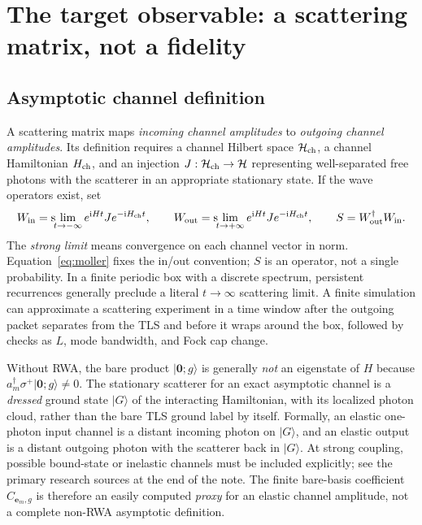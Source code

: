 \documentclass[11pt,a4paper]{article}
\newcommand{\ket}[1]{\lvert #1\rangle}
\newcommand{\ii}{\mathrm i}
\newcommand{\HH}{\mathcal H}
\begin{document}
\section{The target observable: a scattering matrix, not a fidelity}
\label{sec:smatrix}
\subsection{Asymptotic channel definition}
A scattering matrix maps \emph{incoming channel amplitudes} to \emph{outgoing channel amplitudes}. Its definition requires a channel Hilbert space $\HH_{\rm ch}$, a channel Hamiltonian $H_{\rm ch}$, and an injection $J:\HH_{\rm ch}\to\HH$ representing well-separated free photons with the scatterer in an appropriate stationary state. If the wave operators exist, set
\begin{equation}
 W_{\rm in}=\mathrm{s}\!\!\lim_{t\to-\infty}e^{\ii Ht}J e^{-\ii H_{\rm ch}t},\qquad
 W_{\rm out}=\mathrm{s}\!\!\lim_{t\to+\infty}e^{\ii Ht}J e^{-\ii H_{\rm ch}t},
 \qquad S=W_{\rm out}^{\dagger}W_{\rm in}.
 \label{eq:moller}
\end{equation}
The \emph{strong limit} means convergence on each channel vector in norm. Equation~\eqref{eq:moller} fixes the in/out convention; $S$ is an operator, not a single probability. In a finite periodic box with a discrete spectrum, persistent recurrences generally preclude a literal $t\to\infty$ scattering limit. A finite simulation can approximate a scattering experiment in a time window after the outgoing packet separates from the TLS and before it wraps around the box, followed by checks as $L$, mode bandwidth, and Fock cap change.

Without RWA, the bare product $\ket{\mathbf0;g}$ is generally \emph{not} an eigenstate of $H$ because $a_m^\dagger\sigma^+\ket{\mathbf0;g}\ne0$. The stationary scatterer for an exact asymptotic channel is a \emph{dressed} ground state $\ket G$ of the interacting Hamiltonian, with its localized photon cloud, rather than the bare TLS ground label by itself. Formally, an elastic one-photon input channel is a distant incoming photon on $\ket G$, and an elastic output is a distant outgoing photon with the scatterer back in $\ket G$. At strong coupling, possible bound-state or inelastic channels must be included explicitly; see the primary research sources at the end of the note. The finite bare-basis coefficient $C_{\mathbf e_m,g}$ is therefore an easily computed \emph{proxy} for an elastic channel amplitude, not a complete non-RWA asymptotic definition.
\end{document}

